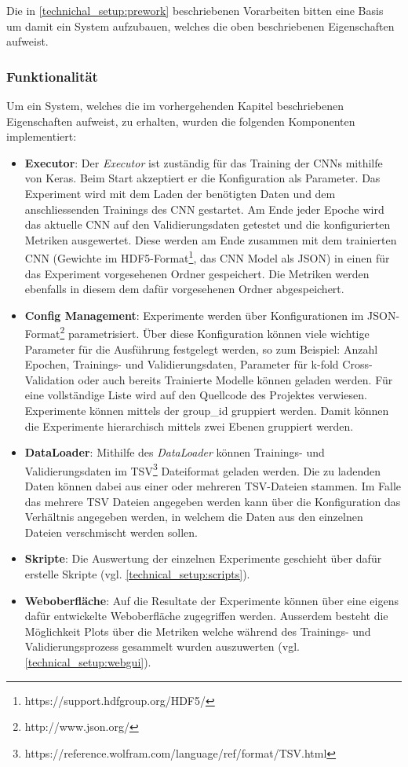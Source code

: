 Die in \ref{technichal_setup:prework} beschriebenen Vorarbeiten bitten eine Basis um damit ein System aufzubauen, welches die oben beschriebenen Eigenschaften aufweist.
\subsubsection{Funktionalität}
\label{technical_setup:functionality}
Um ein System, welches die im vorhergehenden Kapitel beschriebenen Eigenschaften aufweist, zu erhalten, wurden die folgenden Komponenten implementiert:

\begin{itemize}
	\item \textbf{Executor}: Der \emph{Executor} ist zuständig für das Training der CNNs mithilfe von Keras. Beim Start akzeptiert er die Konfiguration als Parameter. Das Experiment wird mit dem Laden der benötigten Daten und dem anschliessenden Trainings des CNN gestartet. Am Ende jeder Epoche wird das aktuelle CNN auf den Validierungsdaten getestet und die konfigurierten Metriken ausgewertet. Diese werden am Ende zusammen mit dem trainierten CNN (Gewichte im HDF5-Format\footnote{https://support.hdfgroup.org/HDF5/}, das CNN Model als JSON) in einen für das Experiment vorgesehenen Ordner gespeichert. Die Metriken werden ebenfalls in diesem dem dafür vorgesehenen Ordner abgespeichert.
	\item \textbf{Config Management}: Experimente werden über Konfigurationen im JSON-Format\footnote{http://www.json.org/} parametrisiert. Über diese Konfiguration können viele wichtige Parameter für die Ausführung festgelegt werden, so zum Beispiel: Anzahl Epochen, Trainings- und Validierungsdaten, Parameter für k-fold Cross-Validation oder auch bereits Trainierte Modelle können geladen werden. Für eine vollständige Liste wird auf den Quellcode des Projektes verwiesen. Experimente können mittels der group{\_}id gruppiert werden. Damit können die Experimente hierarchisch mittels zwei Ebenen gruppiert werden.
	\item \textbf{DataLoader}: Mithilfe des \emph{DataLoader} können Trainings- und Validierungsdaten im TSV\footnote{https://reference.wolfram.com/language/ref/format/TSV.html} Dateiformat geladen werden. Die zu ladenden Daten können dabei aus einer oder mehreren TSV-Dateien stammen. Im Falle das mehrere TSV Dateien angegeben werden kann über die Konfiguration das Verhältnis angegeben werden, in welchem die Daten aus den einzelnen Dateien verschmischt werden sollen.
	\item \textbf{Skripte}: Die Auswertung der einzelnen Experimente geschieht über dafür erstelle Skripte (vgl. \ref{technical_setup:scripts}).
	\item \textbf{Weboberfläche}: Auf die Resultate der Experimente können über eine eigens dafür entwickelte Weboberfläche zugegriffen werden. Ausserdem besteht die Möglichkeit Plots über die Metriken welche während des Trainings- und Validierungsprozess gesammelt wurden auszuwerten (vgl. \ref{technical_setup:webgui}).
\end{itemize}
